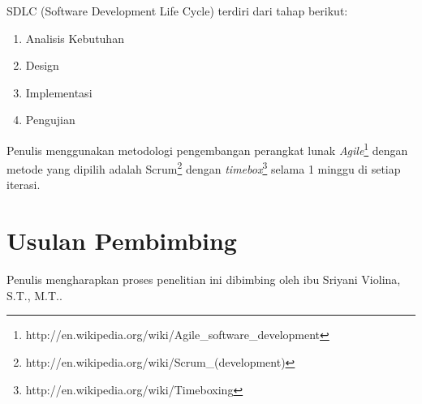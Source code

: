 \documentclass[a4paper, 12pt]{report}
\begin{document}
\begin{flushleft}
SDLC (Software Development Life Cycle) terdiri dari tahap berikut:
\begin{enumerate}
  \item Analisis Kebutuhan
  \item Design
  \item Implementasi
  \item Pengujian
\end{enumerate}

\onehalfspacing Penulis menggunakan metodologi pengembangan perangkat lunak \textit{Agile}\footnote{http://en.wikipedia.org/wiki/Agile\_software\_development} dengan metode yang dipilih adalah Scrum\footnote{http://en.wikipedia.org/wiki/Scrum\_(development)} dengan \textit{timebox}\footnote{http://en.wikipedia.org/wiki/Timeboxing} selama 1 minggu di setiap iterasi.

\end{flushleft}

\section*{Usulan Pembimbing}
\onehalfspacing Penulis mengharapkan proses penelitian ini dibimbing oleh ibu Sriyani Violina, S.T., M.T..
\end{document}
